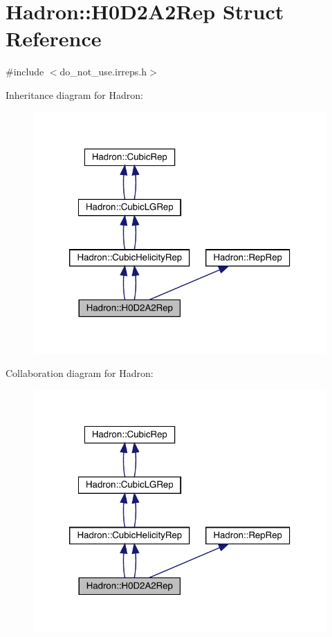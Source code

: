 \hypertarget{structHadron_1_1H0D2A2Rep}{}\section{Hadron\+:\+:H0\+D2\+A2\+Rep Struct Reference}
\label{structHadron_1_1H0D2A2Rep}


{\ttfamily \#include $<$do\+\_\+not\+\_\+use.\+irreps.\+h$>$}



Inheritance diagram for Hadron\+:\nopagebreak
\begin{figure}[H]
\begin{center}
\leavevmode
\includegraphics[width=320pt]{dc/dcc/structHadron_1_1H0D2A2Rep__inherit__graph}
\end{center}
\end{figure}


Collaboration diagram for Hadron\+:\nopagebreak
\begin{figure}[H]
\begin{center}
\leavevmode
\includegraphics[width=320pt]{d8/ddc/structHadron_1_1H0D2A2Rep__coll__graph}
\end{center}
\end{figure}
